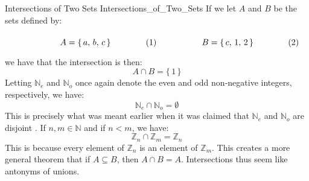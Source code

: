         \begin{fexample}{Intersections of Two Sets}
                        {Intersections_of_Two_Sets}
            If we let $A$ and $B$ be the sets defined by:
            \par\hfill\par
            \begin{subequations}
                \begin{minipage}[b]{0.49\textwidth}
                    \begin{equation}
                        A=\{\,a,\,b,\,c\,\}
                    \end{equation}
                \end{minipage}
                \hfill
                \begin{minipage}[b]{0.49\textwidth}
                    \begin{equation}
                        B=\{\,c,\,1,\,2\,\}
                    \end{equation}
                \end{minipage}
            \end{subequations}
            \par\vspace{2.5ex}
            we have that the intersection is then:
            \begin{equation}
                A\cap{B}=\{\,1\,\}
            \end{equation}
            Letting $\mathbb{N}_{e}$ and $\mathbb{N}_{o}$ once again denote
            the even and odd non-negative integers, respectively, we have:
            \begin{equation}
                \mathbb{N}_{e}\cap\mathbb{N}_{o}=\emptyset
            \end{equation}
            This is precisely what was meant earlier when it was claimed that
            $\mathbb{N}_{e}$ and $\mathbb{N}_{o}$ are disjoint%
            . If $n,m\in\mathbb{N}$ and if $n<m$, we have:
            \begin{equation}
                \mathbb{Z}_{n}\cap\mathbb{Z}_{m}=\mathbb{Z}_{n}
            \end{equation}
            This is because every element of $\mathbb{Z}_{n}$ is an element
            of $\mathbb{Z}_{m}$. This creates a more general theorem that if
            $A\subseteq{B}$, then $A\cap{B}=A$. Intersections thus seem like
            antonyms of unions.
        \end{fexample}
